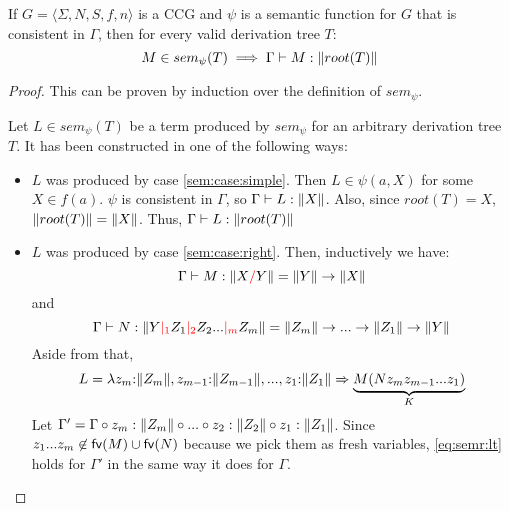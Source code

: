 \documentclass[main.tex]{subfiles}
\begin{document}
\begin{prop}
    \label{ccg:typeconsistent}
    If $ G = \langle \Sigma, N, S, f, n \rangle $ is a CCG and $\psi$ is a
    semantic function for $G$ that is consistent in $\Gamma$, then
    for every valid derivation tree $T$:
    \[
        M \in sem_{\psi}(T) \implies \Gamma \vdash M : \|root(T)\|
    \]
\end{prop}
\begin{proof}
    This can be proven by induction over the definition of $sem_{\psi}$.

    Let $L \in sem_{\psi}(T)$ be a term produced by $sem_{\psi}$ for an
    arbitrary derivation tree $T$. It has been constructed in one of the
    following ways:
    \begin{itemize}
        \item $L$ was produced by case \ref{sem:case:simple}. Then
            $L \in \psi(a, X)$ for some $X \in f(a)$. $\psi$
            is consistent in $\Gamma$, so $\Gamma \vdash L: \|X\|$. Also, since
            $root(T) = X$, $\|root(T)\| = \|X\|$. Thus,
            $\Gamma \vdash L: \|root(T)\|$
        \item $L$ was produced by case \ref{sem:case:right}. Then,
            inductively we have:
            \begin{equation}
                \label{eq:semr:lt}
                \Gamma \vdash M : \|X \textcolor{red}{/} Y\| = \|Y\| \rightarrow \|X\|
            \end{equation}
            and
            \begin{equation}
            \label{eq:semr:rt}
                \Gamma \vdash N : \|Y \textcolor{red}{|_{1}} Z_1 \textcolor{red}{|_{2}} Z_2 ... \textcolor{red}{|_{m}} Z_m\|
                = \|Z_m\| \rightarrow ... \rightarrow \|Z_1\| \rightarrow \|Y\|
            \end{equation}
            Aside from that,
            \begin{equation}
                L = \lambda z_m {:} \|Z_m\|, z_{m - 1} {:} \|Z_{m - 1}\|, ..., z_1 {:} \|Z_1\| \Rightarrow
                \underbrace{M ( N z_m z_{m - 1} ... z_1 )}_{K}
            \end{equation}
            Let $\Gamma' = \Gamma \circ z_m : \|Z_m\| \circ ... \circ
                           z_2 : \|Z_2\| \circ z_1 : \|Z_1\|$.
            Since $z_1 ... z_m \not\in \mathsf{fv}(M) \cup \mathsf{fv}(N)$ because we pick them
            as fresh variables, \cref{eq:semr:lt} holds for $\Gamma'$ in the
            same way it does for $\Gamma$.


\end{itemize}
\end{proof}
\end{document}
